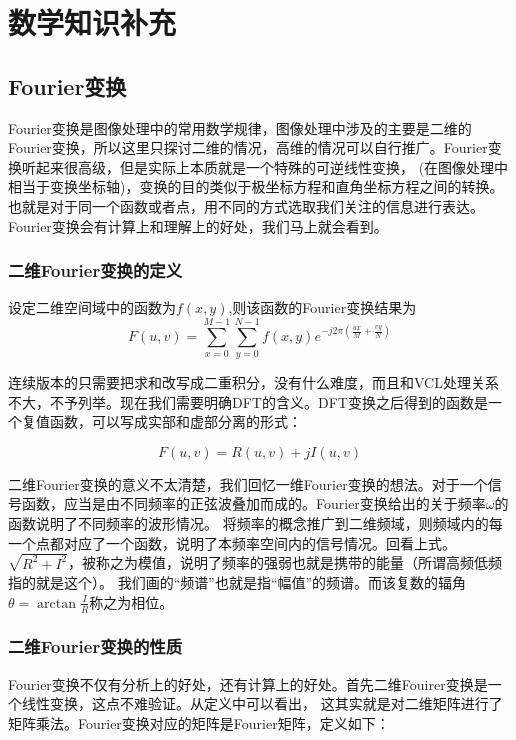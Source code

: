 \section{数学知识补充}

\subsection{Fourier变换}

Fourier变换是图像处理中的常用数学规律，图像处理中涉及的主要是二维的Fourier变换，所以这里只探讨二维的情况，高维的情况可以自行推广。Fourier变换听起来很高级，但是实际上本质就是一个特殊的可逆线性变换，
(在图像处理中相当于变换坐标轴)，变换的目的类似于极坐标方程和直角坐标方程之间的转换。也就是对于同一个函数或者点，用不同的方式选取我们关注的信息进行表达。Fourier变换会有计算上和理解上的好处，我们马上就会看到。
\subsubsection{二维Fourier变换的定义}

\begin{definition}[二维Fourier变换离散版本]
    设定二维空间域中的函数为$f(x,y)$,则该函数的Fourier变换结果为
    \[
    F(u,v) = \sum_{x = 0}^{M - 1} \sum_{y = 0}^{N - 1} f(x,y) e^{-j2\pi\left(\frac{ux}{M} + \frac{vy}{N}\right)}
    \]
\end{definition}

连续版本的只需要把求和改写成二重积分，没有什么难度，而且和VCL处理关系不大，不予列举。现在我们需要明确DFT的含义。DFT变换之后得到的函数是一个复值函数，可以写成实部和虚部分离的形式：

\[
F(u,v) = R(u,v) + j I(u,v)
\]

二维Fourier变换的意义不太清楚，我们回忆一维Fourier变换的想法。对于一个信号函数，应当是由不同频率的正弦波叠加而成的。Fourier变换给出的关于频率$\omega$的函数说明了不同频率的波形情况。
将频率的概念推广到二维频域，则频域内的每一个点都对应了一个函数，说明了本频率空间内的信号情况。回看上式。$\sqrt{R^2 + I^2}$，被称之为模值，说明了频率的强弱也就是携带的能量（所谓高频低频指的就是这个）。
我们画的“频谱”也就是指“幅值”的频谱。而该复数的辐角$\theta = \arctan\frac{I}{R}$称之为相位。

\subsubsection{二维Fourier变换的性质}

Fourier变换不仅有分析上的好处，还有计算上的好处。首先二维Fouirer变换是一个线性变换，这点不难验证。从定义中可以看出，
这其实就是对二维矩阵进行了矩阵乘法。Fourier变换对应的矩阵是Fourier矩阵，定义如下：

